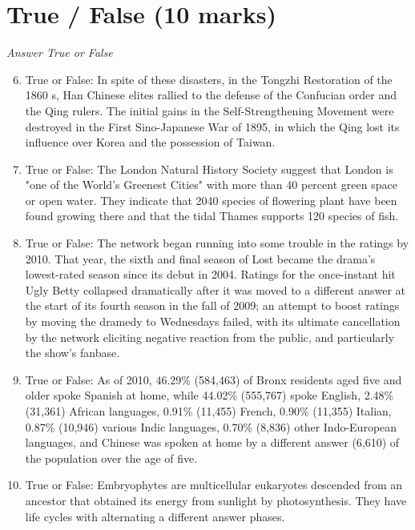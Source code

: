 \documentclass[12pt]{article}
\begin{document}
\section*{True / False (10 marks)}
\textit{Answer True or False}
\begin{enumerate}[label=\arabic*.]
\setcounter{enumi}{5}
\item True or False: In spite of these disasters, in the Tongzhi Restoration of the 1860 s, Han Chinese elites rallied to the defense of the Confucian order and the Qing rulers. The initial gains in the Self-Strengthening Movement were destroyed in the First Sino-Japanese War of 1895, in which the Qing lost its influence over Korea and the possession of Taiwan.
\item True or False: The London Natural History Society suggest that London is "one of the World's Greenest Cities" with more than 40 percent green space or open water. They indicate that 2040 species of flowering plant have been found growing there and that the tidal Thames supports 120 species of fish.
\item True or False: The network began running into some trouble in the ratings by 2010. That year, the sixth and final season of Lost became the drama's lowest-rated season since its debut in 2004. Ratings for the once-instant hit Ugly Betty collapsed dramatically after it was moved to a different answer at the start of its fourth season in the fall of 2009; an attempt to boost ratings by moving the dramedy to Wednesdays failed, with its ultimate cancellation by the network eliciting negative reaction from the public, and particularly the show's fanbase.
\item True or False: As of 2010, 46.29\% (584,463) of Bronx residents aged five and older spoke Spanish at home, while 44.02\% (555,767) spoke English, 2.48\% (31,361) African languages, 0.91\% (11,455) French, 0.90\% (11,355) Italian, 0.87\% (10,946) various Indic languages, 0.70\% (8,836) other Indo-European languages, and Chinese was spoken at home by a different answer (6,610) of the population over the age of five.
\item True or False: Embryophytes are multicellular eukaryotes descended from an ancestor that obtained its energy from sunlight by photosynthesis. They have life cycles with alternating a different answer phases.
\end{enumerate}
\end{document}
